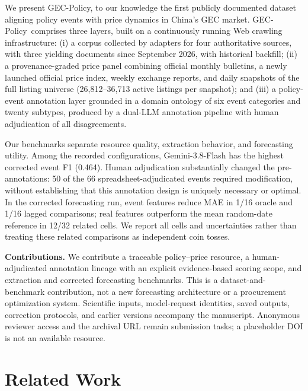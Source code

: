 \documentclass[sigconf,anonymous,review]{acmart}
\newcommand{\dataset}{GEC-Policy\xspace}
\begin{document}
We present \dataset, to our knowledge the first publicly documented dataset aligning policy events with price dynamics in China's GEC market. \dataset\ comprises three layers, built on a continuously running Web crawling infrastructure: (i) a corpus collected by adapters for four authoritative sources, with three yielding documents since September 2026, with historical backfill; (ii) a provenance-graded price panel combining official monthly bulletins, a newly launched official price index, weekly exchange reports, and daily snapshots of the full listing universe (26{,}812--36{,}713 active listings per snapshot); and (iii) a policy-event annotation layer grounded in a domain ontology of six event categories and twenty subtypes, produced by a dual-LLM annotation pipeline with human adjudication of all disagreements.

Our benchmarks separate resource quality, extraction behavior, and forecasting utility. Among the recorded configurations, Gemini-3.8-Flash has the highest corrected event F1 (0.464). Human adjudication substantially changed the pre-annotations: 50 of the 66 spreadsheet-adjudicated events required modification, without establishing that this annotation design is uniquely necessary or optimal. In the corrected forecasting run, event features reduce MAE in 1/16 oracle and 1/16 lagged comparisons; real features outperform the mean random-date reference in 12/32 related cells. We report all cells and uncertainties rather than treating these related comparisons as independent coin tosses.

\textbf{Contributions.} We contribute a traceable policy--price resource, a human-adjudicated annotation lineage with an explicit evidence-based scoring scope, and extraction and corrected forecasting benchmarks. This is a dataset-and-benchmark contribution, not a new forecasting architecture or a procurement optimization system. Scientific inputs, model-request identities, saved outputs, correction protocols, and earlier versions accompany the manuscript. Anonymous reviewer access and the archival URL remain submission tasks; a placeholder DOI is not an available resource.

\section{Related Work}
\end{document}
